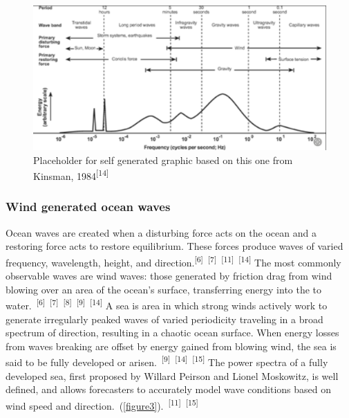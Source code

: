 \documentclass{article}
\begin{document}

\begin{figure} 
    \centering
    \includegraphics[width=1\linewidth]{images/ocean-wave-energy-schematic.png}
    \caption{Placeholder for self generated graphic based on this one from Kinsman, 1984\textsuperscript{[14]}}
    \label{figure2}
\end{figure}

\subsubsection{Wind generated ocean waves}


\par{\hspace{.5cm}Ocean waves are created when a disturbing force acts on the ocean and a restoring force acts to restore equilibrium. These forces produce waves of varied frequency, wavelength, height, and direction.\textsuperscript{[6]}~\textsuperscript{[7]}~\textsuperscript{[11]}~\textsuperscript{[14]} The most commonly observable waves are wind waves: those generated by friction drag from wind blowing over an area of the ocean's surface, transferring energy into the to water.~\textsuperscript{[6]}~\textsuperscript{[7]}~\textsuperscript{[8]}~\textsuperscript{[9]}~\textsuperscript{[14]} A sea is area in which strong winds actively work to generate irregularly peaked waves of varied periodicity traveling in a broad spectrum of direction, resulting in a chaotic ocean surface. When energy losses from waves breaking are offset by energy gained from blowing wind, the sea is said to be fully developed or arisen.~\textsuperscript{[9]}~\textsuperscript{[14]}~\textsuperscript{[15]} The power spectra of a fully developed sea, first proposed by Willard Peirson and Lionel Moskowitz, is well defined, and allows forecasters to accurately model wave conditions based on wind speed and direction.~(\cref{figure3}).~\textsuperscript{[11]}~\textsuperscript{[15]}}
\end{document}
